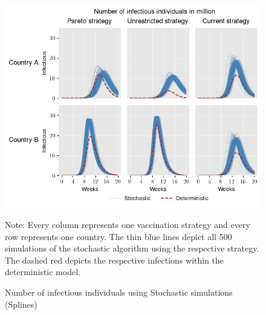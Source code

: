 \begin{figure}[h!]
\centering
\includegraphics[scale=0.85]{images/splines_stochastic_infectious.png}\\
\begin{flushleft}
\scriptsize{Note:} Every column represents one vaccination strategy and every row represents one country. The thin blue lines depict all 500 simulations of the stochastic algorithm using the respective strategy. The dashed red depicts the respective infections within the deterministic model. 
\end{flushleft}
\caption{Number of infectious individuals using Stochastic simulations (Splines)}
\label{fig:results_splines_infectious_dead_stochastic}
\end{figure}















